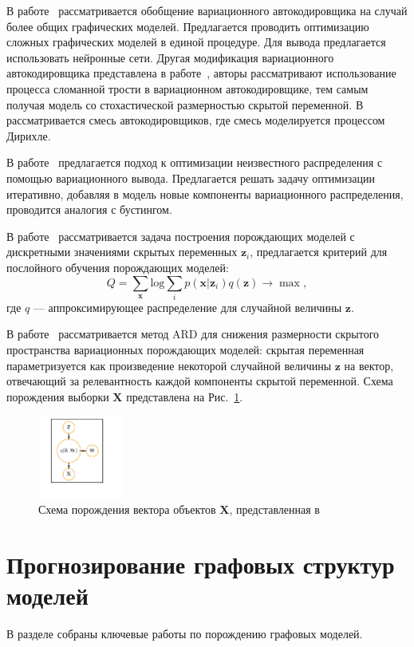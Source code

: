 В работе~\cite{vae_graph} рассматривается обобщение вариационного автокодировщика на случай более общих графических моделей. Предлагается проводить оптимизацию сложных графических моделей в единой процедуре. Для вывода предлагается использовать нейронные сети.
Другая модификация вариационного автокодировщика представлена в работе~\cite{vae_stick}, авторы рассматривают использование процесса сломанной трости в вариационном автокодировщике, тем самым получая модель со стохастической размерностью скрытой переменной. В~\cite{vae_mix} рассматривается смесь автокодировщиков, где смесь моделируется процессом Дирихле.

В работе~\cite{var_boost} предлагается подход к оптимизации неизвестного распределения с помощью вариационного вывода. Предлагается решать задачу оптимизации итеративно, добавляя в модель новые компоненты вариационного распределения, проводится аналогия с бустингом.

В работе~\cite{layerwise_optimal} рассматривается задача построения порождающих моделей с дискретными значениями скрытых переменных $\mathbf{z}_i$, предлагается критерий для послойного обучения порождающих моделей:
\[
    Q = \sum_{\mathbf{x}} \text{log} \sum_{i}p(\mathbf{x}|\mathbf{z}_i)q(\mathbf{z}) \to \max,
\]
где $q$ --- аппроксимирующее распределение для случайной величины $\mathbf{z}$. 

В работе~\cite{vae_ard} рассматривается метод ARD для снижения размерности скрытого пространства вариационных порождающих моделей: скрытая переменная параметризуется как  произведение некоторой случайной величины $\mathbf{z}$  на вектор, отвечающий за релевантность каждой компоненты скрытой переменной. Схема порождения выборки $\mathbf{X}$ представлена на Рис.~\ref{fig:vae_ard}.

\begin{figure}[H]
\centering

\caption{Схема порождения вектора объектов $\mathbf{X}$, представленная в~\cite{vae_ard}}
\label{fig:vae_ard}
\includegraphics[width=0.25\textwidth]{./plots/notebooks/ae_plate.pdf}
\end{figure}

\section{Прогнозирование графовых структур моделей}
В разделе собраны ключевые работы по порождению графовых моделей.

